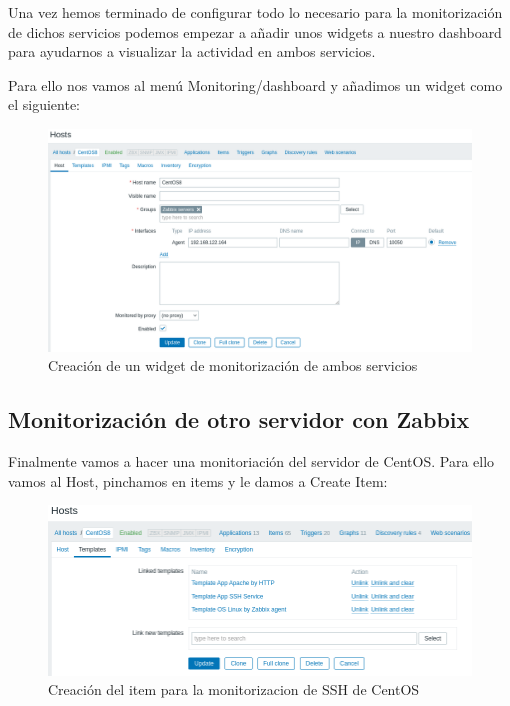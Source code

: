 \newpage
Una vez hemos terminado de configurar todo lo necesario para la monitorización de dichos servicios podemos empezar a añadir unos widgets a nuestro dashboard para ayudarnos a visualizar la actividad en ambos servicios.

Para ello nos vamos al menú Monitoring/dashboard y añadimos un widget como el siguiente:

\begin{figure}[H]
	\centering
	\includegraphics[scale=0.4]{graphics/img28}
	\caption{Creación de un widget de monitorización de ambos servicios}
\end{figure}


\newpage
\subsection{Monitorización de otro servidor con Zabbix}

Finalmente vamos a hacer una monitoriación del servidor de CentOS.
Para ello vamos al Host, pinchamos en items y le damos a Create Item:

\begin{figure}[H]
	\centering
	\includegraphics[scale=0.5]{graphics/img29}
	\caption{Creación del item para la monitorizacion de SSH de CentOS}
\end{figure}

